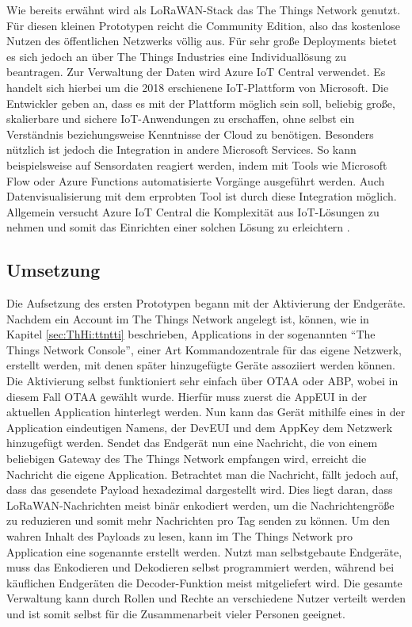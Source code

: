 Wie bereits erwähnt wird als LoRaWAN-Stack das The Things Network genutzt. Für diesen kleinen Prototypen reicht die Community Edition, also das kostenlose Nutzen des öffentlichen Netzwerks völlig aus. Für sehr große Deployments bietet es sich jedoch an über The Things Industries eine Individuallösung zu beantragen. Zur Verwaltung der Daten wird Azure IoT Central verwendet. Es handelt sich hierbei um die 2018 erschienene IoT-Plattform von Microsoft. Die Entwickler geben an, dass es mit der Plattform möglich sein soll, beliebig große, skalier\-bare und sichere IoT-Anwendungen zu erschaffen, ohne selbst ein Verständnis beziehungsweise Kenntnisse der Cloud zu benötigen. Besonders nützlich ist jedoch die Integration in andere Microsoft Services. So kann beispielsweise auf Sensordaten reagiert werden, indem mit Tools wie Microsoft Flow oder Azure Functions automatisierte Vorgänge ausgeführt werden. Auch Datenvisualisierung mit dem erprobten Tool  ist durch diese Integration möglich. Allgemein versucht Azure IoT Central die Komplexität aus IoT-Lösungen zu nehmen und somit das Einrichten einer solchen Lösung zu erleichtern .

\subsection{Umsetzung}
\label{sec:Prot:umsetzung1}

Die Aufsetzung des ersten Prototypen begann mit der Aktivierung der Endgeräte. Nachdem ein Account im The Things Network angelegt ist, können, wie in Kapitel \ref{sec:ThHi:ttntti} beschrieben, Applications in der sogenannten ``The Things Network Console'', einer Art Kommandozentrale für das eigene Netzwerk, erstellt werden, mit denen später hinzugefügte Geräte assoziiert werden können. Die Aktivierung selbst funktioniert sehr einfach über OTAA oder ABP, wobei in diesem Fall OTAA gewählt wurde. Hierfür muss zuerst die AppEUI in der aktuellen Application hinterlegt werden. Nun kann das Gerät mithilfe eines in der Application eindeutigen Namens, der DevEUI und dem AppKey dem Netzwerk hinzugefügt werden. Sendet das Endgerät nun eine Nachricht, die von einem beliebigen Gateway des The Things Network empfangen wird, erreicht die Nachricht die eigene Application. Betrachtet man die Nachricht, fällt jedoch auf, dass das gesendete Payload hexadezimal dargestellt wird. Dies liegt daran, dass LoRaWAN-Nachrichten meist binär enkodiert werden, um die Nachrichtengröße zu reduzieren und somit mehr Nachrichten pro Tag senden zu können. Um den wahren Inhalt des Payloads zu lesen, kann im The Things Network pro Application eine sogenannte  erstellt werden. Nutzt man selbstgebaute Endgeräte, muss das Enkodieren und Dekodieren selbst programmiert werden, während bei käuflichen Endgeräten die Decoder-Funktion meist mitgeliefert wird. Die gesamte Verwaltung kann durch Rollen und Rechte an verschiedene Nutzer verteilt werden und ist somit selbst für die Zusammenarbeit vieler Personen geeignet.

